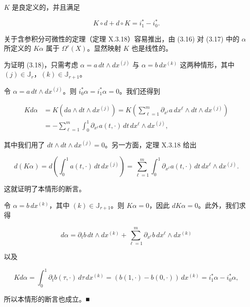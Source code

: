 \begin{lemma}

$ K $ 是良定义的，并且满足

\begin{equation}
K \circ d + d \circ K = i_{1}^{\ast} - i_{0}^{\ast}.\tag{3.18}
\end{equation}

\proofhead
关于含参积分可微性的定理（定理 X.3.18）容易推出，由 (3.16) 对 (3.17) 中的 $ \alpha $ 所定义的 $ K\alpha $ 属于 $ \Omega^{r}(X) $。显然映射 $ K $ 也是线性的。

为证明 (3.18)，只需考虑 $ \alpha = a\,dt \wedge dx^{(j)} $ 与 $ \alpha = b\,dx^{(k)} $ 这两种情形，其中 $ (j) \in \mathbb{J}_{r} $，$ (k) \in \mathbb{J}_{r+1} $。

\begin{subitems}
\item

令 $ \alpha = a\,dt \wedge dx^{(j)} $。则 $ i_{0}^{\ast}\alpha = i_{1}^{\ast}\alpha = 0 $。我们还得到

\begin{equation*}
\begin{aligned}
K d\alpha &= K(da \wedge dt \wedge dx^{(j)}) = K\left( \sum_{\ell=1}^{m} \partial_{x^{\ell}} a\, dx^{\ell} \wedge dt \wedge dx^{(j)} \right) \\ &= -\sum_{\ell=1}^{m} \int_{0}^{1} \partial_{x^{\ell}} a(t, \cdot)\, dt\, dx^{\ell} \wedge dx^{(j)},
\end{aligned}
\end{equation*}

其中我们用了 $ dt \wedge dt \wedge dx^{(j)} = 0 $。另一方面，定理 X.3.18 给出

\[
d(K\alpha) = d\left( \int_{0}^{1} a(t, \cdot)\, dt\, dx^{(j)} \right) = \sum_{\ell=1}^{m} \int_{0}^{1} \partial_{x^{\ell}} a(t, \cdot)\, dt\, dx^{\ell} \wedge dx^{(j)}.
\]

这就证明了本情形的断言。

\item

令 $ \alpha = b\,dx^{(k)} $，其中 $ (k) \in \mathbb{J}_{r+1} $。则 $ K\alpha = 0 $，因此 $ dK\alpha = 0 $。此外，我们求得

\[
d\alpha = \partial_{t} b\, dt \wedge dx^{(k)} + \sum_{\ell=1}^{m} \partial_{x^{\ell}} b\, dx^{\ell} \wedge dx^{(k)}
\]

以及

\[
K d\alpha = \int_{0}^{1} \partial_{t} b(\tau, \cdot)\, d\tau\, dx^{(k)} = (b(1, \cdot) - b(0, \cdot))\, dx^{(k)} = i_{1}^{\ast}\alpha - i_{0}^{\ast}\alpha,
\]

所以本情形的断言也成立。\nobreak\hspace{0.35em}■

\end{subitems}

\end{lemma}

